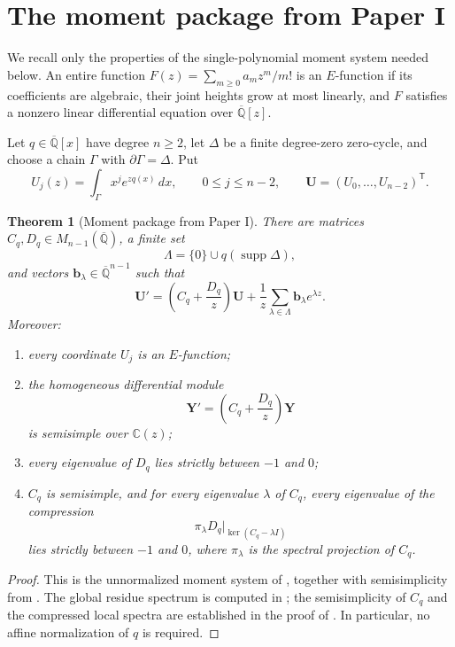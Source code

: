 \documentclass[11pt]{article}
\numberwithin{equation}{section}
\newtheorem{theorem}{Theorem}[section]
\theoremstyle{definition}
\theoremstyle{remark}
\newcommand{\C}{\mathbb C}
\newcommand{\Qbar}{\overline{\mathbb Q}}
\newcommand{\supp}{\operatorname{supp}}
\begin{document}
\section{The moment package from Paper I}\label{sec:moment-package}

We recall only the properties of the single-polynomial moment system needed
below.  An entire function
$F(z)=\sum_{m\ge0}a_mz^m/m!$ is an $E$-function if its coefficients are
algebraic, their joint heights grow at most linearly, and $F$ satisfies a
nonzero linear differential equation over $\Qbar[z]$.

Let $q\in\Qbar[x]$ have degree $n\ge2$, let $\Delta$ be a finite
degree-zero zero-cycle, and choose a chain $\Gamma$ with
$\partial\Gamma=\Delta$.  Put
\begin{equation}\label{eq:moment-vector}
  U_j(z)=\int_\Gamma x^j e^{zq(x)}\,dx,
  \qquad 0\le j\le n-2,
  \qquad
  \mathbf U=(U_0,\ldots,U_{n-2})^{\mathsf T}.
\end{equation}

\begin{theorem}[Moment package from Paper I]\label{thm:moment-package}
There are matrices $C_q,D_q\in M_{n-1}(\Qbar)$, a finite set
\[
  \Lambda=\{0\}\cup q(\supp\Delta),
\]
and vectors $\mathbf b_\lambda\in\Qbar^{n-1}$ such that
\begin{equation}\label{eq:moment-system}
  \mathbf U'
  =\left(C_q+\frac{D_q}{z}\right)\mathbf U
   +\frac1z\sum_{\lambda\in\Lambda}
      \mathbf b_\lambda e^{\lambda z}.
\end{equation}
Moreover:
\begin{enumerate}[label=\textup{(\roman*)},leftmargin=2.4em]
\item every coordinate $U_j$ is an $E$-function;
\item the homogeneous differential module
\[
  \mathbf Y'=\left(C_q+\frac{D_q}{z}\right)\mathbf Y
\]
is semisimple over $\C(z)$;
\item every eigenvalue of $D_q$ lies strictly between $-1$ and $0$;
\item $C_q$ is semisimple, and for every eigenvalue $\lambda$ of $C_q$,
every eigenvalue of the compression
\[
  \pi_\lambda D_q|_{\ker(C_q-\lambda I)}
\]
lies strictly between $-1$ and $0$, where $\pi_\lambda$ is the spectral
projection of $C_q$.
\end{enumerate}
\end{theorem}

\begin{proof}
This is the unnormalized moment system of
\cite[Proposition~2.2]{LongEIT}, together with semisimplicity from
\cite[Proposition~3.1]{LongEIT}.  The global residue spectrum is computed in
\cite[Lemma~2.1]{LongEIT}; the semisimplicity of $C_q$ and the compressed
local spectra are established in the proof of
\cite[Proposition~3.2]{LongEIT}.  In particular, no affine normalization of
$q$ is required.
\end{proof}
\end{document}
